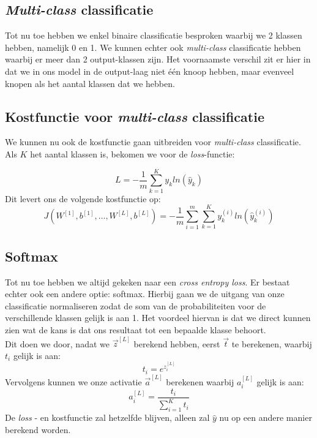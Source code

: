 \subsection{\textit{Multi-class} classificatie}

Tot nu toe hebben we enkel binaire classificatie besproken waarbij we 2 klassen hebben, namelijk 0 en 1. We kunnen echter ook \textit{multi-class} classificatie hebben waarbij er meer dan 2 output-klassen zijn. Het voornaamste verschil zit er hier in dat we in ons model in de output-laag niet één knoop hebben, maar evenveel knopen als het aantal klassen dat we hebben.

\subsection{Kostfunctie voor \textit{multi-class} classificatie}

We kunnen nu ook de kostfunctie gaan uitbreiden voor \textit{multi-class} classificatie. Als $K$ het aantal klassen is, bekomen we voor de \textit{loss}-functie:

\begin{equation}
	L = - \frac{1}{m} \sum_{k=1}^{K} y_{k} ln( \hat{y}_{k})
\end{equation}
\noindent
Dit levert ons de volgende kostfunctie op:
\begin{equation}
	J(W^{[1]}, b^{[1]}, \ldots , W^{[L]}, b^{[L]}) = - \frac{1}{m} \sum_{i=1}^{m} \sum_{k=1}^{K} y_{k}^{(i)} ln( \hat{y}_{k}^{(i)})
\end{equation}

\subsection{Softmax}
\label{ch:softmax}
Tot nu toe hebben we altijd gekeken naar een \textit{cross entropy loss}. Er bestaat echter ook een andere optie: softmax. Hierbij gaan we de uitgang van onze classificatie normaliseren zodat de som van de probabiliteiten voor de verschillende klassen gelijk is aan 1. Het voordeel hiervan is dat we direct kunnen zien wat de kans is dat ons resultaat tot een bepaalde klasse behoort.\\
\newline
Dit doen we door, nadat we $\vec{z}^{[L]}$ berekend hebben, eerst $\vec{t}$ te berekenen, waarbij $t_{i}$ gelijk is aan:
\begin{equation}
	t_{i} = e^{z_{i}^{[L]}}
\end{equation}
\noindent
Vervolgens kunnen we onze activatie $\vec{a}^{[L]}$ berekenen waarbij $a_{i}^{[L]}$ gelijk is aan:
\begin{equation}
	a_{i}^{[L]} = \frac{t_{i}}{\sum_{i=1}^{K} t_{i}}
\end{equation}
\noindent
De \textit{loss} - en kostfunctie zal hetzelfde blijven, alleen zal $\hat{y}$ nu op een andere manier berekend worden. 

